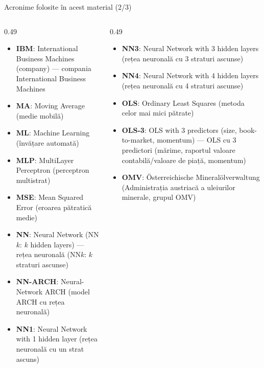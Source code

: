 \begin{frame}{Acronime folosite în acest material (2/3)}
\begin{columns}[T]
\begin{column}{0.49\textwidth}
\begin{itemize}\setlength{\itemsep}{0pt}
    \item \textbf{IBM}: International Business Machines (company) — compania International Business Machines
    \item \textbf{MA}: Moving Average (medie mobilă)
    \item \textbf{ML}: Machine Learning (învățare automată)
    \item \textbf{MLP}: MultiLayer Perceptron (perceptron multistrat)
    \item \textbf{MSE}: Mean Squared Error (eroarea pătratică medie)
    \item \textbf{NN}: Neural Network (NN$k$: $k$ hidden layers) — rețea neuronală (NN$k$: $k$ straturi ascunse)
    \item \textbf{NN-ARCH}: Neural-Network ARCH (model ARCH cu rețea neuronală)
    \item \textbf{NN1}: Neural Network with 1 hidden layer (rețea neuronală cu un strat ascuns)
\end{itemize}
\end{column}
\begin{column}{0.49\textwidth}
\begin{itemize}\setlength{\itemsep}{0pt}
    \item \textbf{NN3}: Neural Network with 3 hidden layers (rețea neuronală cu 3 straturi ascunse)
    \item \textbf{NN4}: Neural Network with 4 hidden layers (rețea neuronală cu 4 straturi ascunse)
    \item \textbf{OLS}: Ordinary Least Squares (metoda celor mai mici pătrate)
    \item \textbf{OLS-3}: OLS with 3 predictors (size, book-to-market, momentum) — OLS cu 3 predictori (mărime, raportul valoare contabilă/valoare de piață, momentum)
    \item \textbf{OMV}: Österreichische Mineralölverwaltung (Administrația austriacă a uleiurilor minerale, grupul OMV)
\end{itemize}
\end{column}
\end{columns}
\end{frame}

